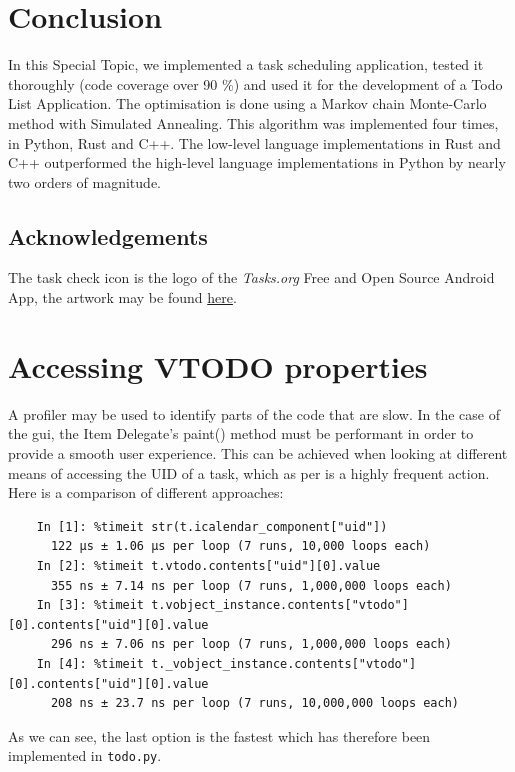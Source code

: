 \documentclass{prettytex/ox/mmsc-special-topic}
\begin{document}
  \section{Conclusion}
  In this Special Topic, we implemented a task scheduling application, tested it thoroughly (code coverage over 90 \%) and used it for the development of a Todo List Application.
  The optimisation is done using a Markov chain Monte-Carlo method with Simulated Annealing.
  This algorithm was implemented four times, in Python, Rust and C++.
  The low-level language implementations in Rust and C++ outperformed the high-level language implementations in Python by nearly two orders of magnitude.

  \subsection{Acknowledgements}
  The task check icon is the logo of the \textit{Tasks.org} Free and Open Source Android App, the artwork may be found \href{https://github.com/tasks/tasks/tree/main/graphics}{here}.

  \pagebreak
  \printbibliography
  \printnoidxglossary[type=acronym]

  \appendix
  \section{Accessing VTODO properties}
  A profiler may be used to identify parts of the code that are slow.
  In the case of the \gls{gui}, the Item Delegate's paint() method must be performant in order to provide a smooth user experience.
  This can be achieved when looking at different means of accessing the UID of a task, which as per  is a highly frequent action.
  Here is a comparison of different approaches:

  \begin{verbatim}
    In [1]: %timeit str(t.icalendar_component["uid"])
      122 µs ± 1.06 µs per loop (7 runs, 10,000 loops each)
    In [2]: %timeit t.vtodo.contents["uid"][0].value
      355 ns ± 7.14 ns per loop (7 runs, 1,000,000 loops each)
    In [3]: %timeit t.vobject_instance.contents["vtodo"][0].contents["uid"][0].value
      296 ns ± 7.06 ns per loop (7 runs, 1,000,000 loops each)
    In [4]: %timeit t._vobject_instance.contents["vtodo"][0].contents["uid"][0].value
      208 ns ± 23.7 ns per loop (7 runs, 10,000,000 loops each)
  \end{verbatim}

  As we can see, the last option is the fastest which has therefore been implemented in \texttt{todo.py}.
\end{document}
